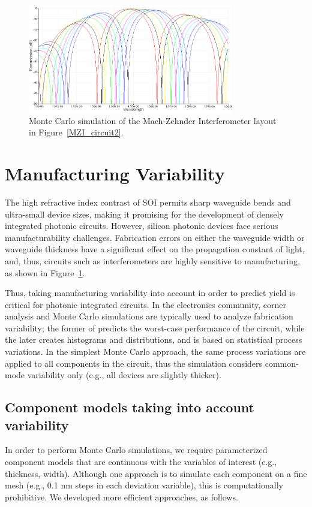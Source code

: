 \documentclass[journal]{spie}
\begin{document}
\graphicspath{{../figs_chris/}}

\begin{figure}[tbp]
	\centering
	\includegraphics[width=0.8\textwidth]{../figs_paper/MZI_circuit2_MC.png}
    \caption[]{Monte Carlo simulation of the Mach-Zehnder Interferometer layout in Figure~\ref{MZI_circuit2}.}
    \label{MZI_circuit2_MC}
\end{figure}



\section{Manufacturing Variability}
\label{sec:variability}
The high refractive index contrast of SOI permits sharp waveguide bends and ultra-small device sizes, making it promising for the development of densely integrated photonic circuits. However, silicon photonic devices face serious manufacturability challenges. Fabrication errors on either the waveguide width or waveguide thickness have a significant effect on the propagation constant of light, and, thus, circuits such as interferometers are highly sensitive to manufacturing, as shown in Figure~\ref{MZI_circuit2_MC}.

Thus, taking manufacturing variability into account in order to predict yield is critical for photonic integrated circuits. In the electronics community, corner analysis and Monte Carlo simulations are typically used to analyze fabrication variability; the former of predicts the worst-case performance of the circuit, while the later creates histograms and distributions, and is based on statistical process variations.  In the simplest Monte Carlo approach, the same process variations are applied to all components in the circuit, thus the simulation considers common-mode variability only (e.g., all devices are slightly thicker).  

\subsection{Component models taking into account variability}
In order to perform Monte Carlo simulations, we require parameterized component models that are continuous with the variables of interest (e.g., thickness, width).  Although one approach is to simulate each component on a fine mesh (e.g., 0.1 nm steps in each deviation variable), this is computationally prohibitive.  We developed more efficient approaches, as follows.
\end{document}
